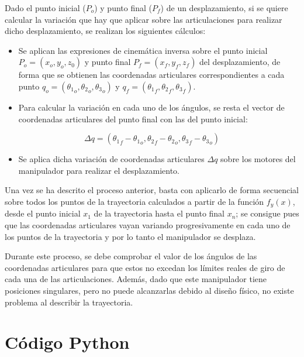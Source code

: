 \documentclass[a4paper,12pt]{article}
\begin{document}
Dado el punto inicial ($P_o$) y punto final ($P_f$) de un desplazamiento, si se quiere calcular la variación que hay que aplicar
sobre las articulaciones para realizar dicho desplazamiento, se realizan los siguientes cálculos:
\begin{itemize}
    \item Se aplican las expresiones de cinemática inversa sobre el punto inicial $P_{o} = \left(x_{o}, y_{o}, z_{0}\right)$
          y punto final $P_{f} = \left(x_{f}, y_{f}, z_{f}\right)$ del desplazamiento, de forma que se obtienen las coordenadas
          articulares correspondientes a cada punto $q_{o} = \left({\theta_{1}}_o, {\theta_{2}}_o,{\theta_{3}}_o\right)$ y
          $q_{f} = \left({\theta_{1}}_f, {\theta_{2}}_f,{\theta_{3}}_f\right)$.
    \item Para calcular la variación en cada uno de los ángulos, se resta el vector de coordenadas articulares del punto final con las del punto inicial:
\end{itemize}
\begin{equation}
    \Delta q = \left({\theta_{1}}_f - {\theta_{1}}_o,{\theta_{2}}_f -{\theta_{2}}_o,{\theta_{3}}_f - {\theta_{3}}_o\right)
\end{equation}
\begin{itemize}
    \item Se aplica dicha variación de coordenadas articulares $\Delta q$ sobre los motores del manipulador para realizar el desplazamiento.
\end{itemize}

Una vez se ha descrito el proceso anterior, basta con aplicarlo de forma secuencial sobre todos los puntos de la
trayectoria calculados a partir de la función $f_y(x)$, desde el punto inicial $x_{1}$ de la trayectoria hasta el
punto final $x_{n}$; se consigue pues que las coordenadas articulares vayan variando progresivamente en cada uno
de los puntos de la trayectoria y por lo tanto el manipulador se desplaza.

Durante este proceso, se debe comprobar el valor de los ángulos de las coordenadas articulares para que estos no
excedan los límites reales de giro de cada una de las articulaciones. Además, dado que este manipulador tiene
posiciones singulares, pero no puede alcanzarlas debido al diseño físico, no existe problema al describir la trayectoria.

\newpage
\printbibliography

\newpage
\appendix
\section{Código Python}

% 
\end{document}
